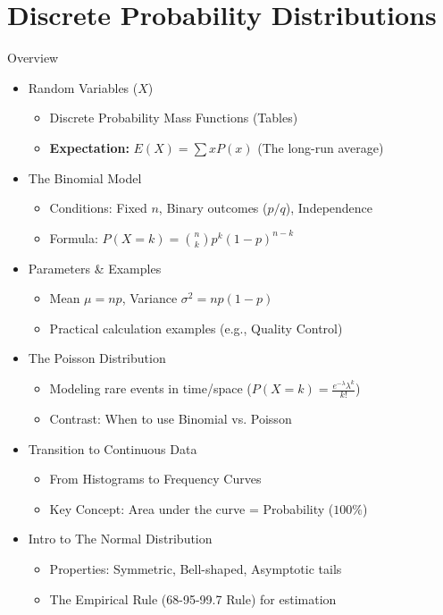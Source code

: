 
\part{Discrete Probability Distributions}

\begin{frame}[allowframebreaks]{Overview}
    \small
    \begin{itemize}
        \item Random Variables ($X$)
            \begin{itemize}
                \item Discrete Probability Mass Functions (Tables)
                \item \textbf{Expectation:} $E(X) = \sum x P(x)$ (The long-run average)
            \end{itemize}
        \item The Binomial Model
            \begin{itemize}
                \item Conditions: Fixed $n$, Binary outcomes ($p/q$), Independence
                \item Formula: $P(X=k) = \binom{n}{k} p^k (1-p)^{n-k}$
            \end{itemize}
        \item Parameters \& Examples
            \begin{itemize}
                \item Mean $\mu = np$, Variance $\sigma^2 = np(1-p)$
                \item Practical calculation examples (e.g., Quality Control)
            \end{itemize}
        \item The Poisson Distribution
            \begin{itemize}
                \item Modeling rare events in time/space ($P(X=k) = \frac{e^{-\lambda} \lambda^k}{k!}$)
                \item Contrast: When to use Binomial vs. Poisson
            \end{itemize}
        \item Transition to Continuous Data
            \begin{itemize}
                \item From Histograms to Frequency Curves
                \item Key Concept: Area under the curve = Probability ($100\%$)
            \end{itemize}
        \item Intro to The Normal Distribution
            \begin{itemize}
                \item Properties: Symmetric, Bell-shaped, Asymptotic tails
                \item The Empirical Rule (68-95-99.7 Rule) for estimation
            \end{itemize}
    \end{itemize}
\end{frame}


